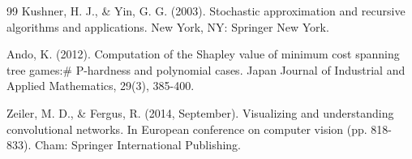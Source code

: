 \documentclass[12pt,a4paper]{ctexart}
\theoremstyle{definition}
\theoremstyle{plain}
\begin{document}
\begin{thebibliography}{99}
Kushner, H. J., \& Yin, G. G. (2003). Stochastic approximation and recursive algorithms and applications. New York, NY: Springer New York.

Ando, K. (2012). Computation of the Shapley value of minimum cost spanning tree games:\# P-hardness and polynomial cases. Japan Journal of Industrial and Applied Mathematics, 29(3), 385-400.

Zeiler, M. D., \& Fergus, R. (2014, September). Visualizing and understanding convolutional networks. In European conference on computer vision (pp. 818-833). Cham: Springer International Publishing.
\end{thebibliography}
\end{document}
